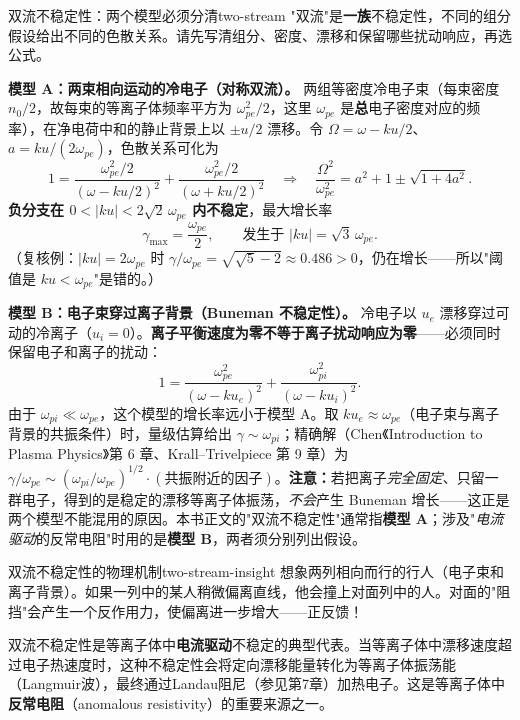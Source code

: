 \documentclass[12pt,a4paper,openany,oneside]{book}
\begin{document}
\begin{theorem}{双流不稳定性：两个模型必须分清}{two-stream}
"双流"是\textbf{一族}不稳定性，不同的组分假设给出不同的色散关系。请先写清组分、密度、漂移和保留哪些扰动响应，再选公式。

\smallskip
\textbf{模型 A：两束相向运动的冷电子（对称双流）。} 两组等密度冷电子束（每束密度 $n_0/2$，故每束的等离子体频率平方为 $\omega_{pe}^2/2$，这里 $\omega_{pe}$ 是\textbf{总}电子密度对应的频率），在净电荷中和的静止背景上以 $\pm u/2$ 漂移。令 $\Omega=\omega-ku/2$、$a=ku/(2\omega_{pe})$，色散关系可化为
\[
1=\frac{\omega_{pe}^2/2}{(\omega-ku/2)^2}+\frac{\omega_{pe}^2/2}{(\omega+ku/2)^2}
\quad\Longrightarrow\quad
\frac{\Omega^2}{\omega_{pe}^2}=a^2+1\pm\sqrt{1+4a^2}.
\]
\textbf{负分支在 $0<|ku|<2\sqrt2\,\omega_{pe}$ 内不稳定}，最大增长率
\[
\gamma_{\max}=\frac{\omega_{pe}}{2},\qquad \text{发生于 }|ku|=\sqrt3\,\omega_{pe}.
\]
（复核例：$|ku|=2\omega_{pe}$ 时 $\gamma/\omega_{pe}=\sqrt{\sqrt5-2}\approx0.486>0$，仍在增长——所以"阈值是 $ku<\omega_{pe}$"是错的。）

\smallskip
\textbf{模型 B：电子束穿过离子背景（Buneman 不稳定性）。} 冷电子以 $u_e$ 漂移穿过可动的冷离子（$u_i=0$）。\textbf{离子平衡速度为零不等于离子扰动响应为零}——必须同时保留电子和离子的扰动：
\[
1=\frac{\omega_{pe}^2}{(\omega-ku_e)^2}+\frac{\omega_{pi}^2}{(\omega-ku_i)^2}.
\]
由于 $\omega_{pi}\ll\omega_{pe}$，这个模型的增长率远小于模型 A。取 $ku_e\approx\omega_{pe}$（电子束与离子背景的共振条件）时，量级估算给出 $\gamma\sim\omega_{pi}$；精确解（Chen《Introduction to Plasma Physics》第 6 章、Krall--Trivelpiece 第 9 章）为 $\gamma/\omega_{pe}\sim(\omega_{pi}/\omega_{pe})^{1/2}\cdot(\text{共振附近的因子})$。\textbf{注意：}若把离子\emph{完全固定}、只留一群电子，得到的是稳定的漂移等离子体振荡，\emph{不会}产生 Buneman 增长——这正是两个模型不能混用的原因。本书正文的"双流不稳定性"通常指\textbf{模型 A}；涉及"\emph{电流驱动}的反常电阻"时用的是\textbf{模型 B}，两者须分别列出假设。
\end{theorem}

\begin{insight}{双流不稳定性的物理机制}{two-stream-insight}
想象两列相向而行的行人（电子束和离子背景）。如果一列中的某人稍微偏离直线，他会撞上对面列中的人。对面的"阻挡"会产生一个反作用力，使偏离进一步增大——正反馈！

双流不稳定性是等离子体中\textbf{电流驱动}不稳定的典型代表。当等离子体中漂移速度超过电子热速度时，这种不稳定性会将定向漂移能量转化为等离子体振荡能（Langmuir波），最终通过Landau阻尼（参见第7章）加热电子。这是等离子体中\textbf{反常电阻}（anomalous resistivity）的重要来源之一。
\end{insight}
\end{document}
